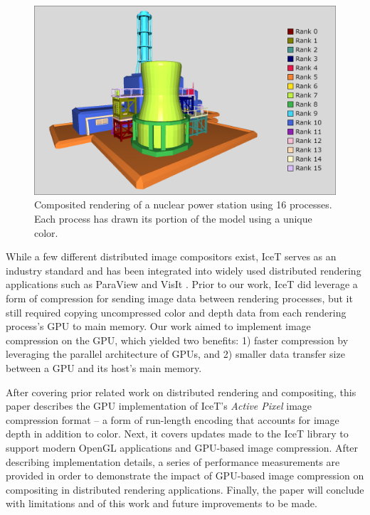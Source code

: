 \documentclass{vgtc}                          %
\begin{document}
\begin{figure}[tb]
 \centering
 \includegraphics[width=\columnwidth]{figures/IceT_NuclearStation_ColorByRank16.png}
 \caption{Composited rendering of a nuclear power station using 16 processes. Each process has drawn its portion of the model using a unique color.}
 \label{fig:intro}
\end{figure}

While a few different distributed image compositors exist, IceT \cite{IceT_UserGuide, Moreland_2011} serves as an industry standard and has been integrated into widely used distributed rendering applications such as ParaView \cite{ParaView} and VisIt \cite{VisIt}. Prior to our work, IceT did leverage a form of compression for sending image data between rendering processes, but it still required copying uncompressed color and depth data from each rendering process's GPU to main memory. Our work aimed to implement image compression on the GPU, which yielded two benefits: 1) faster compression by leveraging the parallel architecture of GPUs, and 2) smaller data transfer size between a GPU and its host's main memory.

After covering prior related work on distributed rendering and compositing, this paper describes the GPU implementation of IceT's \textit{Active Pixel} image compression format -- a form of run-length encoding that accounts for image depth in addition to color. Next, it covers updates made to the IceT library to support modern OpenGL applications and GPU-based image compression. After describing implementation details, a series of performance measurements are provided in order to demonstrate the impact of GPU-based image compression on compositing in distributed rendering applications. Finally, the paper will conclude with limitations and of this work and future improvements to be made.
\end{document}
